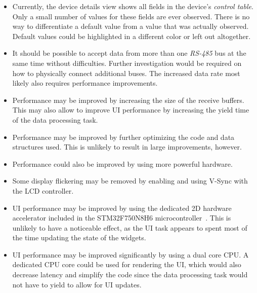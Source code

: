 \begin{itemize}
    \item Currently, the device details view shows all fields in the device's \textit{control table}.
          Only a small number of values for these fields are ever observed. There is no way to
          differentiate a default value from a value that was actually observed. Default values could
          be highlighted in a different color or left out altogether.
    \item It should be possible to accept data from more than one \textit{RS-485} bus at the same time
          without difficulties. Further investigation would be required on how to physically connect
          additional buses. The increased data rate most likely also requires performance improvements.
    \item Performance may be improved by increasing the size of the receive buffers. This may also
          allow to improve UI performance by increasing the yield time of the data processing task.
    \item Performance may be improved by further optimizing the code and data structures used. This
          is unlikely to result in large improvements, however.
    \item Performance could also be improved by using more powerful hardware.
    \item Some display flickering may be removed by enabling and using V-Sync with the LCD controller.
    \item UI performance may be improved by using the dedicated 2D hardware accelerator included in
          the STM32F750N8H6 microcontroller~\cite{mcu-ref-manual}. This is unlikely to have a noticeable
          effect, as the UI task appears to spent most of the time updating the state of the widgets.
    \item UI performance may be improved significantly by using a dual core CPU. A dedicated CPU core
          could be used for rendering the UI, which would also decrease latency and simplify the
          code since the data processing task would not have to yield to allow for UI updates.
\end{itemize}
